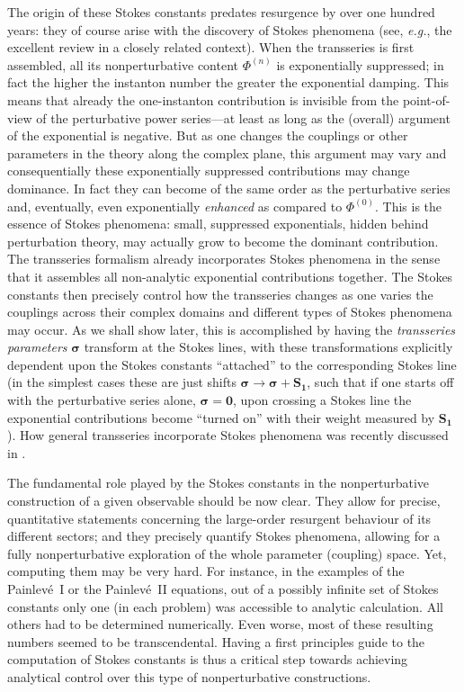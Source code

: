 \documentclass[11pt,a4paper]{article}
\begin{document}
The origin of these Stokes constants predates resurgence by over one hundred years: they of course arise with the discovery of Stokes phenomena \cite{s64} (see, \textit{e.g.}, the excellent review \cite{b91} in a closely related context). When the transseries is first assembled, all its nonperturbative content $\Phi^{(n)}$ is exponentially suppressed; in fact the higher the instanton number the greater the exponential damping. This means that already the one-instanton contribution is invisible from the point-of-view of the perturbative power series---at least as long as the (overall) argument of the exponential is negative. But as one changes the couplings or other parameters in the theory along the complex plane, this argument may vary and consequentially these exponentially suppressed contributions may change dominance. In fact they can become of the same order as the perturbative series and, eventually, even exponentially \textit{enhanced} as compared to $\Phi^{(0)}$. This is the essence of Stokes phenomena: small, suppressed exponentials, hidden behind perturbation theory,  may actually grow to become the dominant contribution. The transseries formalism already incorporates Stokes phenomena in the sense that it assembles all non-analytic exponential contributions together. The Stokes constants then precisely control how the transseries changes as one varies the couplings across their complex domains and different types of Stokes phenomena may occur. As we shall show later, this is accomplished by having the \textit{transseries parameters} $\boldsymbol{\sigma}$ transform at the Stokes lines, with these transformations explicitly dependent upon the Stokes constants ``attached'' to the corresponding Stokes line (in the simplest cases these are just shifts $\boldsymbol{\sigma} \to \boldsymbol{\sigma} + \boldsymbol{S_1}$, such that if one starts off with the perturbative series alone, $\boldsymbol{\sigma}=\boldsymbol{0}$, upon crossing a Stokes line the exponential contributions become ``turned on'' with their weight measured by $\boldsymbol{S_1}$). How general transseries incorporate Stokes phenomena was recently discussed in \cite{as13}.

The fundamental role played by the Stokes constants in the nonperturbative construction of a given observable should be now clear. They allow for precise, quantitative statements concerning the large-order resurgent behaviour of its different sectors; and they precisely quantify Stokes phenomena, allowing for a fully nonperturbative exploration of the whole parameter (coupling) space. Yet, computing them may be very hard. For instance, in the examples of the Painlev\'e~I \cite{msw07, gikm10, asv11} or the Painlev\'e~II \cite{m08, sv13} equations, out of a possibly infinite set of Stokes constants only one (in each problem) was accessible to analytic calculation. All others had to be determined numerically. Even worse, most of these resulting numbers seemed to be transcendental. Having a first principles guide to the computation of Stokes constants is thus a critical step towards achieving analytical control over this type of nonperturbative constructions.
\end{document}
